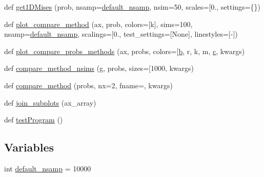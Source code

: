 \begin{DoxyCompactItemize}
\item 
def \mbox{\hyperlink{namespacegetdist__tests_1_1test__distributions_a023a4d63a4ed9241e54b23f96f3dd9c2}{get1\+D\+Mises}} (prob, nsamp=\mbox{\hyperlink{namespacegetdist__tests_1_1test__distributions_af66b4064706bf88e0ed5378ff868fc39}{default\+\_\+nsamp}}, nsim=50, scales=\mbox{[}0., settings=\{\})
\item 
def \mbox{\hyperlink{namespacegetdist__tests_1_1test__distributions_ad9e34543b241b9b5e67b066b1f94d997}{plot\+\_\+compare\+\_\+method}} (ax, prob, colors=\mbox{[}\textquotesingle{}k\textquotesingle{}\mbox{]}, sims=100, nsamp=\mbox{\hyperlink{namespacegetdist__tests_1_1test__distributions_af66b4064706bf88e0ed5378ff868fc39}{default\+\_\+nsamp}}, scalings=\mbox{[}0., test\+\_\+settings=\mbox{[}None\mbox{]}, linestyles=\mbox{[}\textquotesingle{}-\/\textquotesingle{}\mbox{]})
\item 
def \mbox{\hyperlink{namespacegetdist__tests_1_1test__distributions_a39af2372626f003d30a4b041de34f700}{plot\+\_\+compare\+\_\+probs\+\_\+methods}} (ax, probs, colors=\mbox{[}\textquotesingle{}\mbox{\hyperlink{plotTT_8m_ac0431efac4d7c393d1e70b86115cb93f}{b}}\textquotesingle{}, r, k, m, \mbox{\hyperlink{plotTT_8m_ad9d1ac02e33c4aed62ad517a7cb8b3fb}{c}}, kwargs)
\item 
def \mbox{\hyperlink{namespacegetdist__tests_1_1test__distributions_a8a3af891fac318ff66848b94c79a8a17}{compare\+\_\+method\+\_\+nsims}} (g, probs, sizes=\mbox{[}1000, kwargs)
\item 
def \mbox{\hyperlink{namespacegetdist__tests_1_1test__distributions_a6af1d23a030f9dc1de91037323596e1a}{compare\+\_\+method}} (probs, nx=2, fname=\textquotesingle{}\textquotesingle{}, kwargs)
\item 
def \mbox{\hyperlink{namespacegetdist__tests_1_1test__distributions_a72c14bb92b54c7829aae97e81929524f}{join\+\_\+subplots}} (ax\+\_\+array)
\item 
def \mbox{\hyperlink{namespacegetdist__tests_1_1test__distributions_a7c7ad919480f2d240e46dfcbeaa0c155}{test\+Program}} ()
\end{DoxyCompactItemize}
\subsection*{Variables}
\begin{DoxyCompactItemize}
\item 
int \mbox{\hyperlink{namespacegetdist__tests_1_1test__distributions_af66b4064706bf88e0ed5378ff868fc39}{default\+\_\+nsamp}} = 10000
\end{DoxyCompactItemize}


